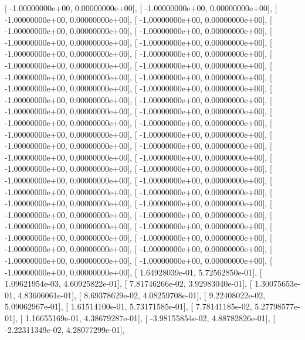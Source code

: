 \documentclass{article}
\begin{document}
       [ -1.00000000e+00,   0.00000000e+00],
       [ -1.00000000e+00,   0.00000000e+00],
       [ -1.00000000e+00,   0.00000000e+00],
       [ -1.00000000e+00,   0.00000000e+00],
       [ -1.00000000e+00,   0.00000000e+00],
       [ -1.00000000e+00,   0.00000000e+00],
       [ -1.00000000e+00,   0.00000000e+00],
       [ -1.00000000e+00,   0.00000000e+00],
       [ -1.00000000e+00,   0.00000000e+00],
       [ -1.00000000e+00,   0.00000000e+00],
       [ -1.00000000e+00,   0.00000000e+00],
       [ -1.00000000e+00,   0.00000000e+00],
       [ -1.00000000e+00,   0.00000000e+00],
       [ -1.00000000e+00,   0.00000000e+00],
       [ -1.00000000e+00,   0.00000000e+00],
       [ -1.00000000e+00,   0.00000000e+00],
       [ -1.00000000e+00,   0.00000000e+00],
       [ -1.00000000e+00,   0.00000000e+00],
       [ -1.00000000e+00,   0.00000000e+00],
       [ -1.00000000e+00,   0.00000000e+00],
       [ -1.00000000e+00,   0.00000000e+00],
       [ -1.00000000e+00,   0.00000000e+00],
       [ -1.00000000e+00,   0.00000000e+00],
       [ -1.00000000e+00,   0.00000000e+00],
       [ -1.00000000e+00,   0.00000000e+00],
       [ -1.00000000e+00,   0.00000000e+00],
       [ -1.00000000e+00,   0.00000000e+00],
       [ -1.00000000e+00,   0.00000000e+00],
       [ -1.00000000e+00,   0.00000000e+00],
       [ -1.00000000e+00,   0.00000000e+00],
       [ -1.00000000e+00,   0.00000000e+00],
       [ -1.00000000e+00,   0.00000000e+00],
       [ -1.00000000e+00,   0.00000000e+00],
       [ -1.00000000e+00,   0.00000000e+00],
       [ -1.00000000e+00,   0.00000000e+00],
       [ -1.00000000e+00,   0.00000000e+00],
       [ -1.00000000e+00,   0.00000000e+00],
       [ -1.00000000e+00,   0.00000000e+00],
       [ -1.00000000e+00,   0.00000000e+00],
       [ -1.00000000e+00,   0.00000000e+00],
       [ -1.00000000e+00,   0.00000000e+00],
       [ -1.00000000e+00,   0.00000000e+00],
       [ -1.00000000e+00,   0.00000000e+00],
       [ -1.00000000e+00,   0.00000000e+00],
       [ -1.00000000e+00,   0.00000000e+00],
       [ -1.00000000e+00,   0.00000000e+00],
       [ -1.00000000e+00,   0.00000000e+00],
       [  1.64928039e-01,   5.72562850e-01],
       [  1.09621954e-03,   4.60925822e-01],
       [  7.81746266e-02,   3.92983040e-01],
       [  1.30075653e-01,   4.83606061e-01],
       [  8.69378629e-02,   4.08259708e-01],
       [  9.22408022e-02,   5.09062967e-01],
       [  1.61514100e-01,   5.73171585e-01],
       [  7.78141185e-02,   5.27798577e-01],
       [  1.16655169e-01,   4.38679287e-01],
       [ -3.98155854e-02,   4.88782826e-01],
       [ -2.22311349e-02,   4.28077299e-01],
\end{document}
